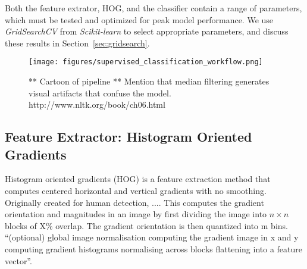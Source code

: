 \documentclass{emulateapj}
\begin{document}
Both the feature extrator, HOG, and the classifier contain a range of
parameters, which must be tested and optimized for peak model
performance.  We use {\em GridSearchCV} from {\em Scikit-learn} to
select appropriate parameters, and discuss these results in
Section~\ref{sec:gridsearch}.

\begin{figure}[t]\label{fig:pipeline}
\begin{center}
\texttt{[image: figures/supervised\_classification\_workflow.png]}
\caption{** Cartoon of pipeline ** Mention that median filtering generates
visual artifacts that confuse the model. http://www.nltk.org/book/ch06.html}
\end{center}
\end{figure}

\subsection{Feature Extractor: Histogram Oriented Gradients}\label{sec:hog}
Histogram oriented gradients (HOG) is a feature extraction method that
computes centered horizontal and vertical gradients with no smoothing.
Originally created for human detection, .... This computes the
gradient orientation and magnitudes in an image by first dividing the
image into $n\times n$ blocks of X\% overlap.  The gradient
orientation is then quantized into m bins. ``(optional) global image
normalisation computing the gradient image in x and y computing
gradient histograms normalising across blocks flattening into a
feature vector''\citep{dalalandtriggs_05}.



\end{document}
